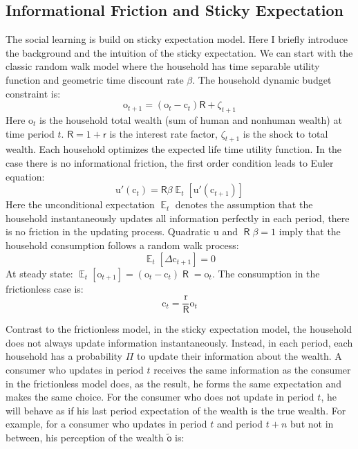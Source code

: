 \documentclass[12pt,letterpaper]{article}
\DeclareMathOperator{\E}{\mathbb{E}}
\DeclareMathOperator{\R}{\mathsf{R}}
\begin{document}
\subsection{Informational Friction and Sticky Expectation}
The social learning is build on \cite{StickyE} sticky expectation model. Here I briefly introduce the background and the intuition of the sticky expectation. We can start with the classic \cite{Hall1978} random walk model where the household has time separable utility function and geometric time discount rate $\beta$. The household dynamic budget constraint is:
\begin{equation} \label{Toy:DBC}
\mathrm{o}_{t+1}=(\mathrm{o}_{t}-\mathrm{c}_{t})\mathsf{R}+\zeta_{t+1}
\end{equation}
Here $\mathrm{o}_{t}$ is the household total wealth (sum of human and nonhuman wealth) at time period $t$. $\mathsf{R}=1+\mathsf{r}$ is the interest rate factor, $\zeta_{t+1}$ is the shock to total wealth. Each household optimizes the expected life time utility function. In the case there is no informational friction, the first order condition leads to Euler equation:
\begin{equation} \label{Toy:Euler}
\mathrm{u}'(\mathrm{c}_{t})=\mathsf{R}\beta\E_{t}\left[\mathrm{u}'(\mathrm{c}_{t+1})\right]
\end{equation}
Here the unconditional expectation $\E_{t}$ denotes the assumption that the household instantaneously updates all information perfectly in each period, there is no friction in the updating process. Quadratic $\mathrm{u}$ and $\R\beta=1$ imply that the household consumption follows a random walk process:
\begin{equation*}
\E_{t}\left[\Delta\mathrm{c}_{t+1}\right]=0
\end{equation*}
At steady state: $\E_{t}\left[\mathrm{o}_{t+1}\right]=\left(\mathrm{o}_{t}-\mathrm{c}_{t}\right)\R=\mathrm{o}_{t}$. The consumption in the frictionless case is:
\begin{equation*}
\mathrm{c}_{t}=\frac{\mathrm{r}}{\R}\mathrm{o}_{t}
\end{equation*}
\par
Contrast to the frictionless model, in the sticky expectation model, the household does not always update information instantaneously. Instead, in each period, each household has a probability $\Pi$ to update their information about the wealth. A consumer who updates in period $t$ receives the same information as the consumer in the frictionless model does, as the result, he forms the same expectation and makes the same choice. For the consumer who does not update in period $t$, he will behave as if his last period expectation of the wealth is the true wealth. For example, for a consumer who updates in period $t$ and period $t+n$ but not in between, his perception of the wealth $\tilde{\mathsf{o}}$ is:
\end{document}
